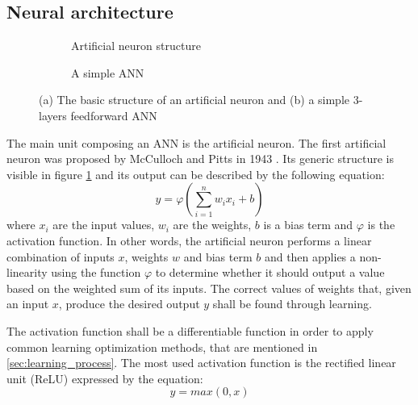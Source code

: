 \subsection{Neural architecture}
\begin{figure}
    \centering
    \begin{subfigure}[b]{0.6\textwidth}
        \resizebox{\textwidth}{!}{  }
        \caption{Artificial neuron structure}
        \label{subfig:artificial_neuron}
    \end{subfigure}\hspace{2em}
    \begin{subfigure}[b]{0.3\textwidth}
        \resizebox{\textwidth}{!}{  }
        \vspace{0.7em}
        \caption{A simple ANN}
        \label{subfig:simple_nn}
    \end{subfigure}
    
    \caption{(a) The basic structure of an artificial neuron and (b) a simple 3-layers feedforward ANN}
    \label{fig:artificial_neuron}
\end{figure}

The main unit composing an ANN is the artificial neuron.
The first artificial neuron was proposed by McCulloch and Pitts in 1943 \cite{McCulloch1943}.
Its generic structure is visible in figure \ref{subfig:artificial_neuron} and its output can be described by the following equation:
\begin{equation}
y = \varphi(\sum\limits_{i=1}^n w_ix_i + b)
\label{eqn:artificial_neuron}
\end{equation}
where $x_i$ are the input values, $w_i$ are the weights, $b$ is a bias term and $\varphi$ is the activation function.
In other words, the artificial neuron performs a linear combination of inputs $x$, weights $w$ and bias term $b$ and then applies a non-linearity using the function $\varphi$ to determine whether it should output a value based on the weighted sum of its inputs.
The correct values of weights that, given an input $x$, produce the desired output $y$ shall be found through learning.

The activation function shall be a differentiable function in order to apply common learning optimization methods, that are mentioned in \ref{sec:learning_process}.
The most used activation function is the rectified linear unit (ReLU) \cite{ramachandran2017searching} expressed by the equation:
\begin{equation}
    y = max(0, x)
    \label{eqn:relu}
\end{equation}

